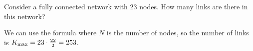 
Consider a fully connected network with 23 nodes. How many links are there in this network?

\solution
We can use the formula
where $N$ is the number of nodes, so the number of links is $K_{\rm max}=23\cdot \frac{22}{2} = 253$.

